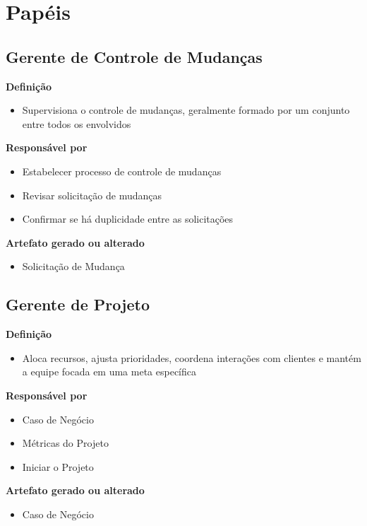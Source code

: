 \section{Papéis}

\subsection{Gerente de Controle de Mudanças}

\textbf{Definição}
\begin{itemize}
\item Supervisiona o controle de mudanças, geralmente formado por um conjunto entre todos os envolvidos
\end{itemize}

\textbf{Responsável por}
\begin{itemize}
\item Estabelecer processo de controle de mudanças
\item Revisar solicitação de mudanças
\item Confirmar se há duplicidade entre as solicitações
\end{itemize}

\textbf{Artefato gerado ou alterado}
\begin{itemize}
\item Solicitação de Mudança
\end{itemize}

\subsection{Gerente de Projeto}

\textbf{Definição}
\begin{itemize}
\item Aloca recursos, ajusta prioridades, coordena interações com clientes e mantém a equipe focada em uma meta específica
\end{itemize}

\textbf{Responsável por}
\begin{itemize}
\item Caso de Negócio
\item Métricas do Projeto
\item Iniciar o Projeto
\end{itemize}

\textbf{Artefato gerado ou alterado}
\begin{itemize}
\item Caso de Negócio
\end{itemize}

